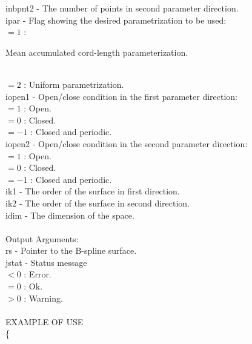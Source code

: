         \>\>    {\fov inbpnt2} \> - \> The number of points in second
                                       parameter direction.\\
        \>\>    {\fov ipar} \> - \> Flag showing the desired
                                    parametrization to be used:\\
                 \>\>\>\> $= 1$ \>:
                 \begin{minipg5}
                   Mean accumulated cord-length
                   parameterization.
                 \end{minipg5}\\[0.8ex]
                 \>\>\>\> $= 2$ \>: Uniform parametrization.\\
        \>\>    {\fov iopen1} \> - \>
          Open/close condition in the first parameter direction:\\
          \>\>\>\> $=1$ \>: Open.\\
          \>\>\>\> $=0$ \>: Closed. \\
          \>\>\>\> $=-1$ \>: Closed and periodic.\\
\newpagetabs
        \>\>    {\fov iopen2} \> - \>
          Open/close condition in the second parameter direction:\\
          \>\>\>\> $=1$ \>: Open.\\
          \>\>\>\> $=0$ \>: Closed. \\
          \>\>\>\> $=-1$ \>: Closed and periodic.\\
        \>\>    {\fov ik1} \> - \> The order of the surface in first direction.\\
        \>\>    {\fov ik2} \> - \> The order of the surface in second direction.\\
        \>\>    {\fov idim} \> - \> The dimension of the space.\\
\\
        \>Output Arguments:\\
        \>\>    {\fov rs} \> - \> Pointer to the B-spline surface.\\
         \>\>    {\fov jstat} \> - \> Status message\\
                \>\>\>\> $< 0$ \>: Error.\\
                \>\>\>\> $= 0$ \>: Ok.\\
                \>\>\>\> $> 0$ \>: Warning.\\
\\
EXAMPLE OF USE\\
        \>      \{ \\
